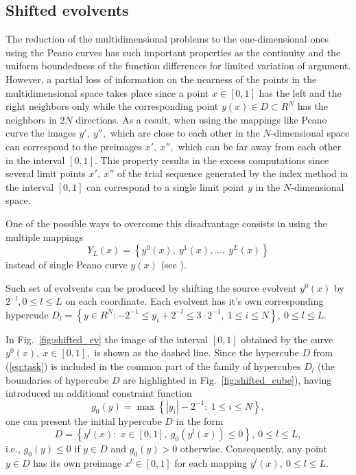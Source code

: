 \documentclass[runningheads]{llncs}
\begin{document}
\subsection{Shifted evolvents}
\label{sec:shifted}

The reduction of the multidimensional problems to the one-dimensional ones using the Peano curves has such important properties as the continuity and the uniform boundedness of the function differences for limited variation of argument. However, a partial loss of information on the nearness of the points in the multidimensional space takes place since a point $x \in [0,1]$ has the left and the right neighbors only while the corresponding point $y(x) \in D \subset R^N$ has the neighbors in $2N$ directions. As a result, when using the mappings like Peano curve the images $y',\ y'',$ which are close to each other in the $N$-dimensional space can correspond to the preimages $x',\ x'',$ which can be far away from each other in the interval $[0,1]$. This property results in the excess computations since several limit points $x',\ x''$ of the trial sequence generated by the index method in the interval $[0,1]$ can correspond to a single limit point $y$ in the $N$-dimensional space.

One of the possible ways to overcome this disadvantage consists in using the multiple mappings
\begin{equation}%
Y_L(x)=\left\{y^0(x),\ y^1(x),...,\ y^L(x)\right\}
\end{equation}
instead of single Peano curve $y(x)$ (see \cite{Strongin1991,Strongin1992,strSergGO}).

Such set of evolvents can be produced by shifting the source evolvent $y^0(x)$ by $2^{-l},0 \leq l \leq L$ on each coordinate. Each evolvent has it's own corresponding hypercude $D_l= \left\{y \in R^N: -2^{-1} \leq y_i+2^{-l} \leq 3 \cdot 2^{-1},\ 1\leq i\leq N\right\},\ 0 \leq l \leq L$.

In Fig.~\ref{fig:shifted_ev} the image of the interval $[0,1]$ obtained by the curve $y^0(x),\ x\in [0,1],$ is shown as the dashed line. Since the hypercube $D$ from (\ref{eq:task}) is included in the common part of the family of hypercubes $D_l$ (the boundaries of hypercube $D$ are highlighted in Fig.~\ref{fig:shifted_cube}), having introduced an additional constraint function
\begin{equation}\label{6_g0}
g_0(y)=\max\left\{\left|y_i\right| - 2^{-1}:\ 1\leq i\leq N\right\},
\end{equation}
one can present the initial hypercube $D$ in the form
\[
D=\left\{y^l(x):\; x\in [0,1],\ g_0(y^l(x))\leq 0 \right\},\ 0\leq l \leq L,
\]
i.e., $g_0(y) \leq 0$ if $y\in D$ and $g_0(y)>0$ otherwise. Consequently, any point $y \in D$ has its own preimage $x^l \in [0,1]$ for each mapping $y^l(x),\ 0\leq l\leq L$.
\end{document}

